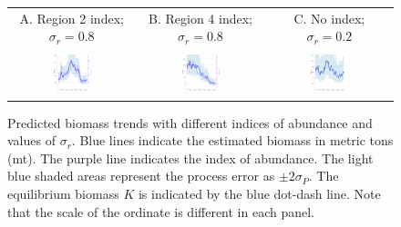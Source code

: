 \documentclass[12pt,letterpaper]{article}
\begin{document}
\begin{figure}
\begin{center}
{\scriptsize \sffamily
\begin{tabular}{ccc}
A. Region 2 index; $\sigma_r=0.8$ &
B. Region 4 index; $\sigma_r=0.8$ &
C. No index; $\sigma_r=0.2$ \\
\\
\includegraphics[width=0.33\textwidth]{./4-gear-runs_r2_est_popB1.pdf} &
\includegraphics[width=0.33\textwidth]{./4-gear-runs_r4_est_popB1.pdf} &
\includegraphics[width=0.33\textwidth]{./4-gear-runs_r0-sdrprior_est_popB1.pdf}\\
\end{tabular}
}
\caption{Predicted biomass trends with different indices of abundance
and values of $\sigma_r$.
Blue lines indicate the estimated biomass in metric tons (mt).
The purple line indicates the index of abundance.
The light blue shaded areas represent the process error as 
$\pm 2\sigma_P$.
The equilibrium biomass $K$ is indicated by the blue dot-dash line.
Note that the scale of the ordinate is different in each panel.
\label{fig:estbiomass}}
\end{center}
\end{figure}
\end{document}
